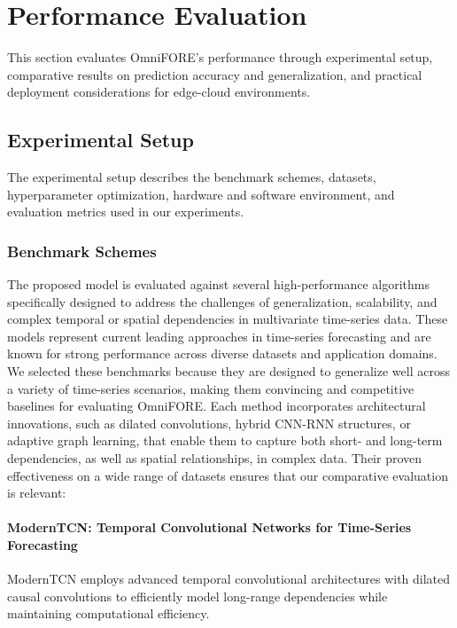 \section{Performance Evaluation}
\label{sec:ch4_evaluation}

This section evaluates \ac{OmniFORE}'s performance through experimental setup, comparative results on prediction accuracy and generalization, and practical deployment considerations for edge-cloud environments.

\subsection{Experimental Setup}
\label{sec:ch4_datasets}

The experimental setup describes the benchmark schemes, datasets, hyperparameter optimization, hardware and software environment, and evaluation metrics used in our experiments.

\subsubsection{Benchmark Schemes}

The proposed model is evaluated against several high-performance algorithms specifically designed to address the challenges of generalization, scalability, and complex temporal or spatial dependencies in multivariate time-series data. These models represent current leading approaches in time-series forecasting and are known for strong performance across diverse datasets and application domains. We selected these benchmarks because they are designed to generalize well across a variety of time-series scenarios, making them convincing and competitive baselines for evaluating \ac{OmniFORE}. Each method incorporates architectural innovations, such as dilated convolutions, hybrid \ac{CNN}-\ac{RNN} structures, or adaptive graph learning, that enable them to capture both short- and long-term dependencies, as well as spatial relationships, in complex data. Their proven effectiveness on a wide range of datasets ensures that our comparative evaluation is relevant:
\paragraph{ModernTCN: Temporal Convolutional Networks for Time-Series Forecasting~\cite{ModernTCN}}
\ac{ModernTCN} employs advanced temporal convolutional architectures with dilated causal convolutions to efficiently model long-range dependencies while maintaining computational efficiency.


